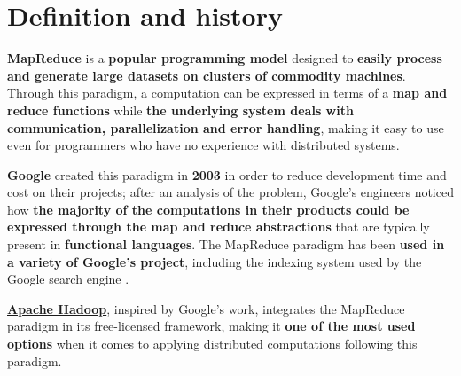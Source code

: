 \section*{Definition and history}\label{definition_and_history}
\textbf{MapReduce} is a \textbf{popular programming model} designed to \textbf{easily process and generate large datasets on clusters of commodity machines}. Through this paradigm, a computation can be expressed in terms of a \textbf{map and reduce functions} while \textbf{the underlying system deals with communication, parallelization and error handling}, making it easy to use even for programmers who have no experience with distributed systems.

\textbf{Google} created this paradigm in \textbf{2003} in order to reduce development time and cost on their projects; after an analysis of the problem, Google's engineers noticed how \textbf{the majority of the computations in their products could be expressed through the map and reduce abstractions} that are typically present in \textbf{functional languages}. The MapReduce paradigm has been \textbf{used in a variety of Google's project}, including the indexing system used by the Google search engine \cite{google_mapreduce}.

\textbf{\href{https://hadoop.apache.org/}{Apache Hadoop}}, inspired by Google's work, integrates the MapReduce paradigm in its free-licensed framework, making it \textbf{one of the most used options} when it comes to applying distributed computations following this paradigm.
